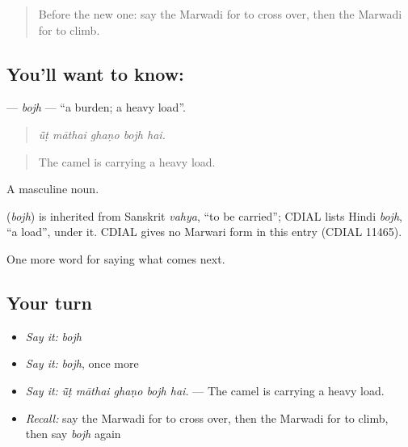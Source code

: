 \label{lesson:MW-C217-bojh}



\begin{quote}
Before the new one: say the Marwadi for to cross over, then the Marwadi for to climb.
\end{quote}

\subsection*{You'll want to know: }
\textbf{} — \emph{bojh} — \textquotedblleft{}a burden; a heavy load\textquotedblright{}.

\begin{quote}
    
\end{quote}

\begin{quote}
\emph{ū̃ṭ māthai ghaṇo bojh hai.}
\end{quote}

\begin{quote}
The camel is carrying a heavy load.
\end{quote}

A masculine noun.

\begin{cousinweb}
\textbf{} (\emph{bojh}) is inherited from Sanskrit \emph{vahya}, \textquotedblleft{}to be carried\textquotedblright{}; CDIAL lists Hindi \emph{bojh}, \textquotedblleft{}a load\textquotedblright{}, under it. CDIAL gives no Marwari form in this entry (CDIAL 11465).
\end{cousinweb}

\begin{grammarlens}[title={What you've built}]
One more word for saying what comes next.
\end{grammarlens}

\subsection*{Your turn}
\begin{itemize}
\raggedright
  \item \emph{Say it:} \emph{bojh}
  \item \emph{Say it:} \emph{bojh}, once more
  \item \emph{Say it:} \emph{ū̃ṭ māthai ghaṇo bojh hai.} — The camel is carrying a heavy load.
  \item \emph{Recall:} say the Marwadi for to cross over, then the Marwadi for to climb, then say \emph{bojh} again
\end{itemize}

